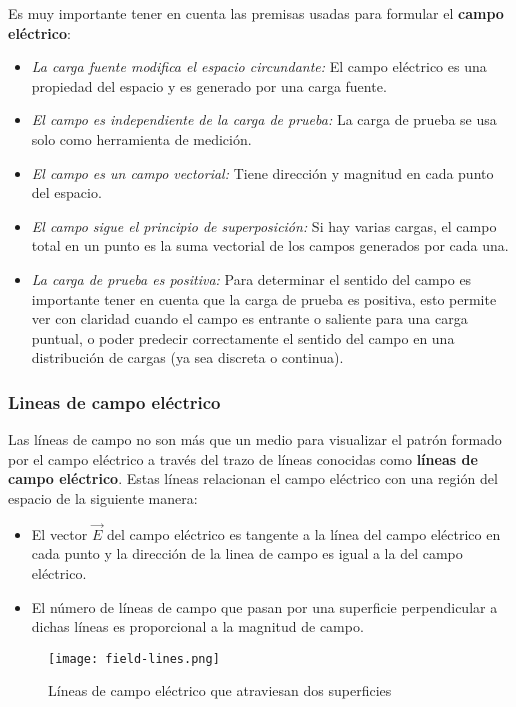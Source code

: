 Es muy importante tener en cuenta las premisas usadas para formular el \textbf{campo eléctrico}:
\begin{itemize}
    \item \textit{La carga fuente modifica el espacio circundante:} El campo eléctrico es una propiedad del espacio y es generado por una carga fuente.
    \item \textit{El campo es independiente de la carga de prueba:} La carga de prueba se usa solo como herramienta de medición.
    \item \textit{El campo es un campo vectorial:} Tiene dirección y magnitud en cada punto del espacio.
    \item \textit{El campo sigue el principio de superposición:} Si hay varias cargas, el campo total en un punto es la suma vectorial de los campos generados por cada una.
    \item \textit{La carga de prueba es positiva:} Para determinar el sentido del campo es importante tener en cuenta que la carga de prueba es positiva, esto permite ver con claridad cuando el campo es entrante o saliente para una carga puntual, o poder predecir correctamente el sentido del campo en una distribución de cargas (ya sea discreta o continua).
\end{itemize}

\subsubsection{Lineas de campo eléctrico}

Las líneas de campo no son más que un medio para visualizar el patrón formado por el campo eléctrico a través del trazo de líneas conocidas como \textbf{líneas de campo eléctrico}. Estas líneas relacionan el campo eléctrico con una región del espacio de la siguiente manera:
\begin{itemize}
    \item El vector \(\vec{E}\) del campo eléctrico es tangente a la línea del campo eléctrico en cada punto y la dirección de la linea de campo es igual a la del campo eléctrico.
    \item El número de líneas de campo que pasan por una superficie perpendicular a dichas líneas es proporcional a la magnitud de campo.
\end{itemize}

\begin{figure}[ht]
    \centering
    \texttt{[image: field-lines.png]}
    \caption{Líneas de campo eléctrico que atraviesan dos superficies}
    \label{fig:lineas_de_campo}
\end{figure}

